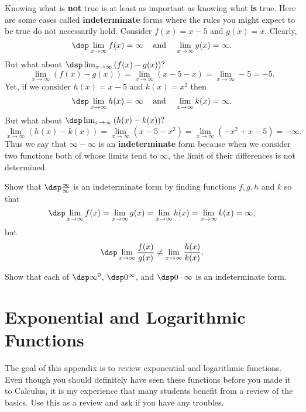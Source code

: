 Knowing what is {\bf not} true is at least as important as knowing what {\bf is} true.  Here are some cases called {\bf indeterminate} forms where the rules you might expect to be true do not necessarily hold.    Consider $f(x) = x-5$ and $g(x) = x.$ Clearly,  $$\dsp \lim_{x \rightarrow \infty} f(x) = \infty \;\;\; \mbox{     and     } \;\;\; \lim_{x \rightarrow \infty} g(x) = \infty.$$ But what about $\dsp \lim_{x \rightarrow \infty} \left( f(x) - g(x) \right) ?$
$$\lim_{x \rightarrow \infty} \left( f(x) - g(x) \right)  = \lim_{x \rightarrow \infty} \left( x-5 - x \right) = \lim_{x \rightarrow \infty} -5 = -5.$$ Yet, if we consider $h(x) = x-5$ and $k(x) = x^2$ then $$\dsp \lim_{x \rightarrow \infty} h(x) = \infty \;\;\; \mbox{     and     } \;\;\; \lim_{x \rightarrow \infty} k(x) = \infty.$$  But what about $\dsp \lim_{x \rightarrow \infty} \left( h(x) - k(x) \right)?$ $$\lim_{x \rightarrow \infty} \left( h(x) - k(x) \right) = \lim_{x \rightarrow \infty} \left( x-5 - x^2 \right) = \lim_{x \rightarrow \infty} \left( -x^2 + x - 5 \right) = -\infty.$$ Thus we say that $\infty - \infty$ is an {\bf indeterminate} form because when we consider two functions both of whose limits tend to $\infty$, the limit of their differences is not determined.

\begin{prb}
Show that $\dsp \frac{\infty}{\infty}$ is an indeterminate form by finding functions $f, g, h$ and $k$ so that
$$\dsp \lim_{x \rightarrow \infty} f(x) = \lim_{x \rightarrow \infty} g(x) =\lim_{x \rightarrow \infty} h(x) =\lim_{x \rightarrow \infty} k(x)=\infty,$$
but
$$\dsp \lim_{x \rightarrow \infty} \frac{f(x)}{g(x)} \neq  \lim_{x \rightarrow \infty} \frac{h(x)}{k(x)}.$$
\end{prb}

\begin{prb}
Show that each of  $\dsp \infty^0$, $\dsp 0^\infty$, and $\dsp 0 \cdot \infty$ is an indeterminate form.
\end{prb}

\section{Exponential and Logarithmic Functions} \label{appexp}

\setcounter{dfn}{0}
\setcounter{prb}{0}
\setcounter{axm}{0}
\setcounter{expl}{0}
\setcounter{lem}{0}
\setcounter{thm}{0}

The goal of this appendix is to review exponential and logarithmic functions. Even though you should definitely have seen these functions before you made it to Calculus, it is my experience that many students benefit from a review of the basics.  Use this as a review and ask if you have any troubles.

